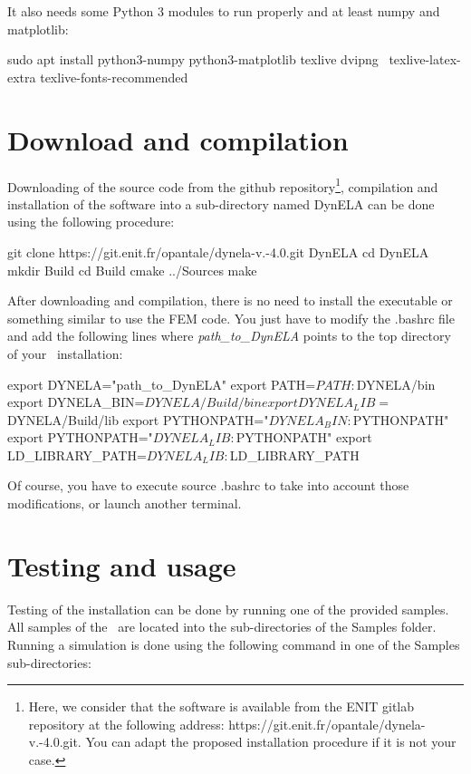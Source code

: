 It also needs some Python 3 modules to run properly and at least numpy and matplotlib:

\begin{BashListing}[numbers=none]
sudo apt install python3-numpy python3-matplotlib texlive dvipng \
texlive-latex-extra texlive-fonts-recommended
\end{BashListing}

\section{Download and compilation}

Downloading of the source code from the github repository\footnote{Here, we consider that the software is available from the ENIT gitlab repository at the following address: https://git.enit.fr/opantale/dynela-v.-4.0.git. You can adapt the proposed installation procedure if it is not your case.}, compilation and installation of the software into a sub-directory named \textsf{DynELA} can be done using the following procedure:

\begin{BashListing}[numbers=none]
git clone https://git.enit.fr/opantale/dynela-v.-4.0.git DynELA
cd DynELA
mkdir Build
cd Build
cmake ../Sources
make
\end{BashListing}

After downloading and compilation, there is no need to install the executable or something similar to use the FEM code. You just have to modify the \textsf{.bashrc} file and add the following lines where \emph{path\_to\_DynELA} points to the top directory of your \DynELA~installation:

\begin{BashListing}[numbers=none]
export DYNELA="path_to_DynELA"
export PATH=$PATH:$DYNELA/bin
export DYNELA_BIN=$DYNELA/Build/bin
export DYNELA_LIB=$DYNELA/Build/lib
export PYTHONPATH="$DYNELA_BIN:$PYTHONPATH"
export PYTHONPATH="$DYNELA_LIB:$PYTHONPATH"
export LD_LIBRARY_PATH=$DYNELA_LIB:$LD_LIBRARY_PATH
\end{BashListing}

Of course, you have to execute \textsf{source .bashrc} to take into account those modifications, or launch another terminal.

\section{Testing and usage}

Testing of the installation can be done by running one of the provided samples. All samples of the \DynELA~are located into the sub-directories of the Samples folder. Running a simulation is done using the following command in one of the Samples sub-directories:


